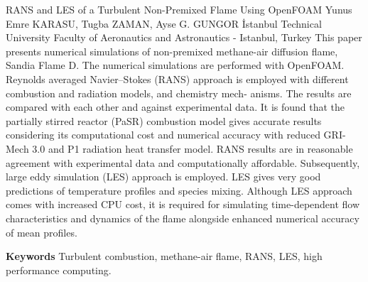 
    \begin{abstract_online}{RANS and LES of a Turbulent Non-Premixed Flame Using OpenFOAM}{%
        Yunus Emre KARASU, Tugba ZAMAN, Ayse G. GUNGOR}{%
        }{%
        İstanbul Technical University Faculty of Aeronautics and Astronautics - Istanbul, Turkey}
    This paper presents numerical simulations of non-premixed methane-air diffusion flame, Sandia Flame D. The numerical simulations are performed with OpenFOAM. Reynolds averaged Navier–Stokes (RANS) approach is employed with different combustion and radiation models, and chemistry mech- anisms. The results are compared with each other and against experimental data. It is found that the partially stirred reactor (PaSR) combustion model gives accurate results considering its computational cost and numerical accuracy with reduced GRI-Mech 3.0 and P1 radiation heat transfer model. RANS results are in reasonable agreement with experimental data and computationally affordable. Subsequently, large eddy simulation (LES) approach is employed. LES gives very good predictions of temperature profiles and species mixing. Although LES approach comes with increased CPU cost, it is required for simulating time-dependent flow characteristics and dynamics of the flame alongside enhanced numerical accuracy of mean profiles. 
    
        \textbf{Keywords} \newline{}Turbulent combustion, methane-air flame, RANS, LES, high performance computing.
    \end{abstract_online}
    